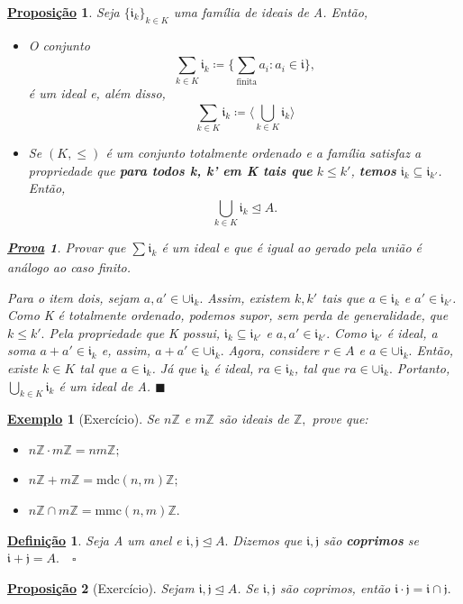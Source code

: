 \documentclass{article}
\newtheorem*{def*}{\underline{Defini\c c\~ao}}
\newtheorem*{prop*}{\underline{Proposi\c c\~ao}}
\newtheorem{example}{\underline{Exemplo}}
\newtheorem*{proof*}{\underline{Prova}}
\renewcommand\qedsymbol{$\blacksquare$}
\begin{document}
\begin{prop*}
  Seja \(\{\mathfrak{i}_{k}\}_{k\in K}\) uma família de ideais de A. Então,
 \begin{itemize}
  \item[1)] O conjunto 
  \[
    \sum\limits_{k\in K}^{}\mathfrak{i}_{k}\coloneqq \biggl\{\sum\limits_{\text{finita}}^{}a_{i}: a_{i}\in \mathfrak{i}\biggr\},
  \]
  é um ideal e, além disso, 
  \[
    \sum\limits_{k\in K}^{}\mathfrak{i}_{k}\coloneqq \biggl\langle \bigcup_{k\in K}^{}{\mathfrak{i}_{k}} \biggr\rangle
  \]
  \item[2)] Se \((K,\leq )\) é um conjunto totalmente ordenado e a família satisfaz a propriedade que
\textbf{para todos k, k' em K tais que} \(k\leq k'\), \textbf{temos} \(\mathfrak{i}_{k}\subseteq{\mathfrak{i}_{k'}}\). Então, 
  \[
    \bigcup_{k\in K}^{}{\mathfrak{i}_{k}}\trianglelefteq{A}.
  \]
 \end{itemize}
 \begin{proof*}
  Provar que \(\sum\limits_{}^{}\mathfrak{i}_{k}\) é um ideal e que é igual ao gerado pela união é análogo ao caso finito.

  Para o item dois, sejam \(a, a'\in \cup \mathfrak{i}_{k}.\) Assim, existem \(k, k'\) tais que \(a\in \mathfrak{i}_{k}\) e \(a'\in \mathfrak{i}_{k'}\).
Como K é totalmente ordenado, podemos supor, sem perda de generalidade, que \(k\leq k'.\) Pela propriedade que K possui,
 \(\mathfrak{i}_{k}\subseteq{\mathfrak{i}_{k'}}\) e \(a, a'\in \mathfrak{i}_{k'}.\) Como \(\mathfrak{i}_{k'}\) é ideal, a soma
 \(a + a'\in \mathfrak{i}_{k}\) e, assim, \(a + a'\in\cup \mathfrak{i}_{k}.\) Agora, considere \(r\in A\)
 e \(a\in \cup \mathfrak{i}_{k}.\) Então, existe \(k\in K\) tal que \(a\in \mathfrak{i}_{k}\). Já que \(\mathfrak{i}_{k}\)
é ideal, \(ra\in \mathfrak{i}_{k}\), tal que \(ra\in \cup \mathfrak{i}_{k}.\) Portanto, \(\bigcup_{k\in K}^{}{\mathfrak{i}_{k}}\) é um
ideal de A. \qedsymbol
 \end{proof*}
\end{prop*}
\begin{example}[Exercício]
  Se \(n \mathbb{Z}\) e \(m \mathbb{Z}\) são ideais de \(\mathbb{Z},\) prove que:
 \begin{itemize}
  \item[1)] \(n \mathbb{Z}\cdot m \mathbb{Z} = nm \mathbb{Z};\)
  \item[2)] \(n \mathbb{Z} + m \mathbb{Z} = \mathrm{mdc}(n, m) \mathbb{Z};\)
  \item[3)] \(n \mathbb{Z}\cap m \mathbb{Z} = \mathrm{mmc}(n, m) \mathbb{Z}.\)
 \end{itemize}
\end{example}
\begin{def*}
  Seja A um anel e \(\mathfrak{i}, \mathfrak{j}\trianglelefteq{A}.\) Dizemos que \(\mathfrak{i}, \mathfrak{j}\) são \textbf{coprimos}
se \(\mathfrak{i} + \mathfrak{j} = A.\quad\square\)
\end{def*}
\begin{prop*}[Exercício]
  Sejam \(\mathfrak{i}, \mathfrak{j}\trianglelefteq{A}\). Se \(\mathfrak{i}, \mathfrak{j}\) são coprimos, então \(\mathfrak{i}\cdot \mathfrak{j} = \mathfrak{i}\cap \mathfrak{j}.\)
\end{prop*}
\newpage
\end{document}
